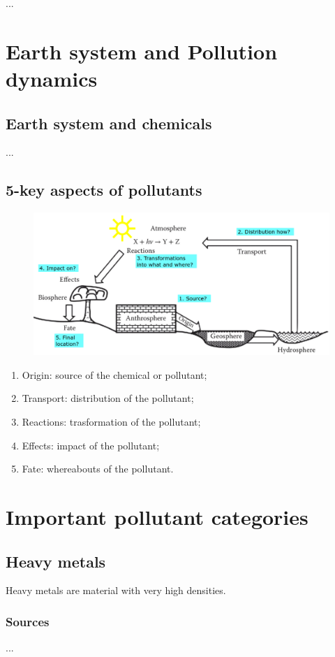 \documentclass{article}
\newcommand{\cfig}[1]{%
  \begin{figure}[ht!]%
    \centering%
    #1%
  \end{figure}%
}
\begin{document}
...

\section{Earth system and Pollution dynamics}
\subsection{Earth system and chemicals}
...

\subsection{5-key aspects of pollutants}
\cfig{\includegraphics*[width=\textwidth]{media/pollutant aspects.png}}

\begin{enumerate}
    \item Origin: source of the chemical or pollutant;
    \item Transport: distribution of the pollutant;
    \item Reactions: trasformation of the pollutant;
    \item Effects: impact of the pollutant;
    \item Fate: whereabouts of the pollutant.
\end{enumerate}

\section{Important pollutant categories}
\subsection{Heavy metals}
Heavy metals are material with very high densities.

\subsubsection{Sources}
...
\end{document}
